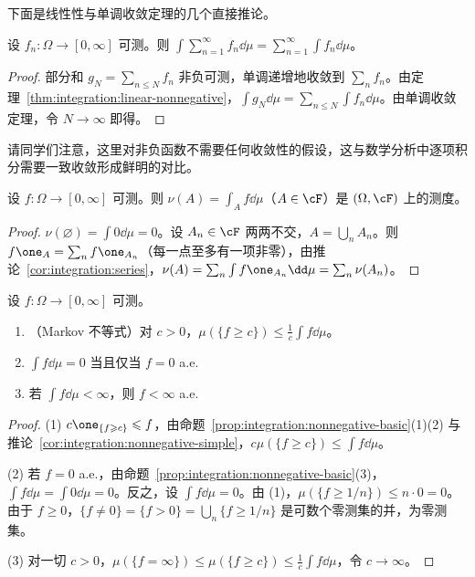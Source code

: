 下面是线性性与单调收敛定理的几个直接推论。

\begin{corollary}[逐项积分]\label{cor:integration:series}
设 $f_n:\Omega\to[0,\infty]$ 可测。则 $\int\sum_{n=1}^\infty f_n\dd\mu=\sum_{n=1}^\infty\int f_n\dd\mu$。
\end{corollary}
\begin{proof}
部分和 $g_N=\sum_{n\leqslant N}f_n$ 非负可测，单调递增地收敛到 $\sum_nf_n$。由定理~\ref{thm:integration:linear-nonnegative}，$\int g_N\dd\mu=\sum_{n\leqslant N}\int f_n\dd\mu$。由单调收敛定理，令 $N\to\infty$ 即得。
\end{proof}

请同学们注意，这里对非负函数不需要任何收敛性的假设，这与数学分析中逐项积分需要一致收敛形成鲜明的对比。

\begin{corollary}[不定积分是测度]\label{cor:integration:indefinite}
设 $f:\Omega\to[0,\infty]$ 可测。则 $\nu(A)=\int_Af\dd\mu$（$A\in\cF$）是 $(\Omega,\cF)$ 上的测度。
\end{corollary}
\begin{proof}
$\nu(\varnothing)=\int0\dd\mu=0$。设 $A_n\in\cF$ 两两不交，$A=\bigcup_nA_n$。则 $f\one_A=\sum_nf\one_{A_n}$（每一点至多有一项非零），由推论~\ref{cor:integration:series}，$\nu(A)=\sum_n\int f\one_{A_n}\dd\mu=\sum_n\nu(A_n)$。
\end{proof}

\begin{proposition}\label{prop:integration:markov}
设 $f:\Omega\to[0,\infty]$ 可测。
\begin{enumerate}
\item （Markov 不等式）对 $c>0$，$\mu(\{f\geqslant c\})\leqslant\frac1c\int f\dd\mu$。
\item $\int f\dd\mu=0$ 当且仅当 $f=0$ a.e.
\item 若 $\int f\dd\mu<\infty$，则 $f<\infty$ a.e.
\end{enumerate}
\end{proposition}
\begin{proof}
(1) $c\one_{\{f\geqslant c\}}\leqslant f$，由命题~\ref{prop:integration:nonnegative-basic}(1)(2) 与推论~\ref{cor:integration:nonnegative-simple}，$c\mu(\{f\geqslant c\})\leqslant\int f\dd\mu$。

(2) 若 $f=0$ a.e.，由命题~\ref{prop:integration:nonnegative-basic}(3)，$\int f\dd\mu=\int0\dd\mu=0$。反之，设 $\int f\dd\mu=0$。由 (1)，$\mu(\{f\geqslant1/n\})\leqslant n\cdot0=0$。由于 $f\geqslant0$，$\{f\neq0\}=\{f>0\}=\bigcup_n\{f\geqslant1/n\}$ 是可数个零测集的并，为零测集。

(3) 对一切 $c>0$，$\mu(\{f=\infty\})\leqslant\mu(\{f\geqslant c\})\leqslant\frac1c\int f\dd\mu$，令 $c\to\infty$。
\end{proof}

